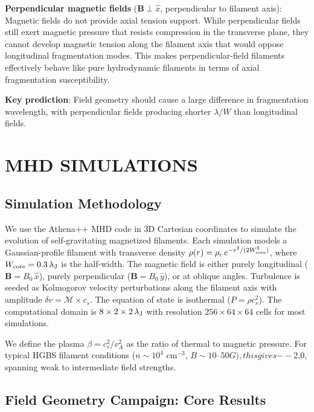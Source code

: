 \documentclass[twoside,twocolumn]{mnras}
\begin{document}
\textbf{Perpendicular magnetic fields} ($\mathbf{B} \perp \hat{x}$, perpendicular to filament axis): Magnetic fields do not provide axial tension support. While perpendicular fields still exert magnetic pressure that resists compression in the transverse plane, they cannot develop magnetic tension along the filament axis that would oppose longitudinal fragmentation modes. This makes perpendicular-field filaments effectively behave like pure hydrodynamic filaments in terms of axial fragmentation susceptibility.

\textbf{Key prediction}: Field geometry should cause a large difference in fragmentation wavelength, with perpendicular fields producing shorter $\lambda/W$ than longitudinal fields.

\section{MHD SIMULATIONS}

\subsection{Simulation Methodology}

We use the Athena++ MHD code \citep{Stone2008} in 3D Cartesian coordinates to simulate the evolution of self-gravitating magnetized filaments. Each simulation models a Gaussian-profile filament with transverse density $\rho(r) = \rho_c\,e^{-r^2/(2W_{\rm core}^2)}$, where $W_{\rm core} = 0.3\,\lambda_{\rm J}$ is the half-width. The magnetic field is either purely longitudinal ($\mathbf{B} = B_0\,\hat{x}$), purely perpendicular ($\mathbf{B} = B_0\,\hat{y}$), or at oblique angles. Turbulence is seeded as Kolmogorov velocity perturbations along the filament axis with amplitude $\delta v = \mathcal{M} \times c_s$. The equation of state is isothermal ($P = \rho c_s^2$). The computational domain is $8 \times 2 \times 2\,\lambda_{\rm J}$ with resolution $256 \times 64 \times 64$ cells for most simulations.

We define the plasma $\beta = c_s^2/v_A^2$ as the ratio of thermal to magnetic pressure. For typical HGBS filament conditions ($n \sim 10^4$ cm$^{-3}$, $B \sim 10$--$50 $\mu$G), this gives $\beta {}$--$2.0, spanning weak to intermediate field strengths.

\subsection{Field Geometry Campaign: Core Results}
\end{document}
